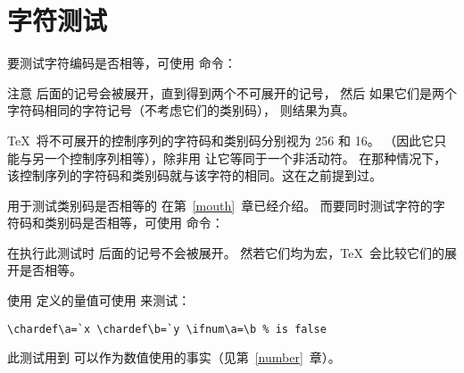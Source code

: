 \documentclass{book}
\begin{document}
\section{字符测试}

要测试字符编码是否相等，可使用  命令：
\begin{disp}\end{disp}
注意  后面的记号会被展开，直到得到两个不可展开的记号，
然后  如果它们是两个字符码相同的字符记号（不考虑它们的类别码），
则结果为真。


\TeX\ 将不可展开的控制序列的字符码和类别码分别视为 256 和 16。%
（因此它只能与另一个控制序列相等），除非用  让它等同于一个非活动符。
在那种情况下，该控制序列的字符码和类别码就与该字符的相同。这在之前提到过。


用于测试类别码是否相等的  在第~\ref{mouth}~章已经介绍。
而要同时测试字符的字符码和类别码是否相等，可使用  命令：
\begin{disp}\end{disp}
在执行此测试时  后面的记号不会被展开。
然若它们均为宏，\TeX\ 会比较它们的展开是否相等。

使用  定义的量值可使用  来测试：
\begin{verbatim}
\chardef\a=`x \chardef\b=`y \ifnum\a=\b % is false
\end{verbatim}
此测试用到  可以作为数值使用的事实（见第~\ref{number}~章）。
\end{document}
